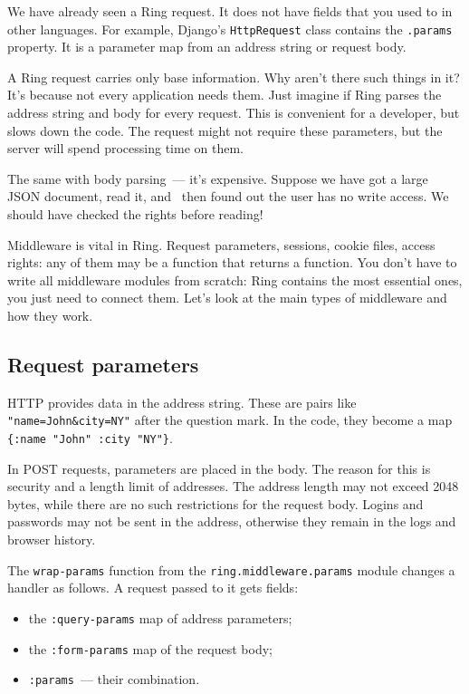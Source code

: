 We have already seen a Ring request. It does not have fields that you used to in other languages. For example, Django's \verb|HttpRequest| class contains the \verb|.params| property. It is a parameter map from an address string or request body.

A Ring request carries only base information. Why aren't there such things in it? It's because not every application needs them. Just imagine if Ring parses the address string and body for every request. This is convenient for a developer, but slows down the code. The request might not require these parameters, but the server will spend processing time on them.

The same with body parsing~--- it's expensive. Suppose we have got a large JSON document, read it, and  then found out the user has no write access. We should have checked the rights before reading!

Middleware is vital in Ring. Request parameters, sessions, cookie files, access rights: any of them may be a function that returns a function. You don't have to write all middleware modules from scratch: Ring contains the most essential ones, you just need to connect them. Let's look at the main types of middleware and how they work.

\subsection{Request parameters}

\label{ring-params}


HTTP provides data in the address string. These are pairs like \verb|"name=John&city=NY"| after the question mark. In the code, they become a map \verb|{:name "John" :city "NY"}|.

In POST requests, parameters are placed in the body. The reason for this is security and a length limit of addresses. The address length may not exceed 2048 bytes, while there are no such restrictions for the request body. Logins and passwords may not be sent in the address, otherwise they remain in the logs and browser history.


The \verb|wrap-params| function from the \verb|ring.middleware.params| module changes a handler as follows. A request passed to it gets fields:

\begin{itemize}

\item
the \verb|:query-params| map of address parameters;

\item
the \verb|:form-params| map of the request body;

\item
\verb|:params|~--- their combination.

\end{itemize}

